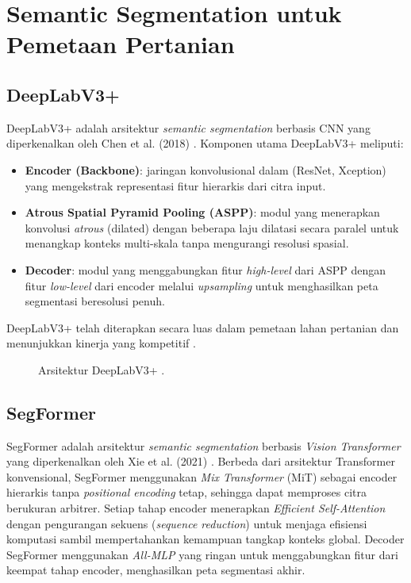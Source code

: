 \section{Semantic Segmentation untuk Pemetaan Pertanian}
\subsection{DeepLabV3+}
DeepLabV3+ adalah arsitektur \textit{semantic segmentation} berbasis CNN yang diperkenalkan oleh Chen et al. (2018) \citep{chen2018}.
Komponen utama DeepLabV3+ meliputi:
\begin{itemize}
    \item \textbf{Encoder (Backbone)}: jaringan konvolusional dalam (ResNet, Xception) yang mengekstrak representasi fitur hierarkis dari citra input.
    \item \textbf{Atrous Spatial Pyramid Pooling (ASPP)}: modul yang menerapkan konvolusi \textit{atrous} (dilated) dengan beberapa laju dilatasi secara paralel untuk menangkap konteks multi-skala tanpa mengurangi resolusi spasial.
    \item \textbf{Decoder}: modul yang menggabungkan fitur \textit{high-level} dari ASPP dengan fitur \textit{low-level} dari encoder melalui \textit{upsampling} untuk menghasilkan peta segmentasi beresolusi penuh.
\end{itemize}
DeepLabV3+ telah diterapkan secara luas dalam pemetaan lahan pertanian dan menunjukkan kinerja yang kompetitif \citep{chang2023, li2023, cheng2023}.

\begin{figure}[H]
    \centering
    \caption{Arsitektur DeepLabV3+ \citep{chen2018}.}
    \label{fig:deeplabv3}
\end{figure}

\subsection{SegFormer}
SegFormer adalah arsitektur \textit{semantic segmentation} berbasis \textit{Vision Transformer} yang diperkenalkan oleh Xie et al. (2021) \citep{xie2021}.
Berbeda dari arsitektur Transformer konvensional, SegFormer menggunakan \textit{Mix Transformer} (MiT) sebagai encoder hierarkis tanpa \textit{positional encoding} tetap, sehingga dapat memproses citra berukuran arbitrer.
Setiap tahap encoder menerapkan \textit{Efficient Self-Attention} dengan pengurangan sekuens (\textit{sequence reduction}) untuk menjaga efisiensi komputasi sambil mempertahankan kemampuan tangkap konteks global.
Decoder SegFormer menggunakan \textit{All-MLP} yang ringan untuk menggabungkan fitur dari keempat tahap encoder, menghasilkan peta segmentasi akhir.

